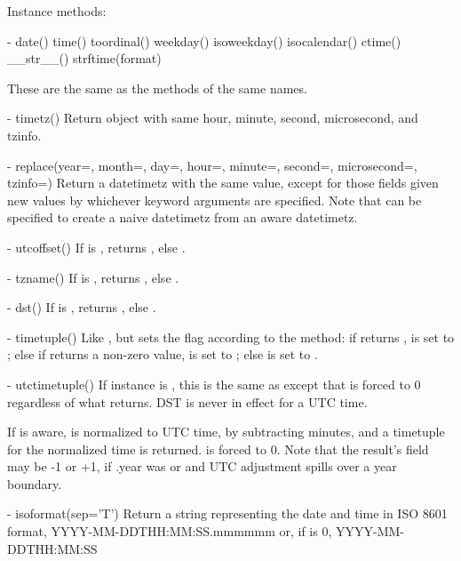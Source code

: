 Instance methods:

  - date()
    time()
    toordinal()
    weekday()
    isoweekday()
    isocalendar()
    ctime()
    __str__()
    strftime(format)

    These are the same as the  methods of the same names.

  - timetz()
    Return  object with same hour, minute, second, microsecond,
    and tzinfo.

  - replace(year=, month=, day=, hour=, minute=, second=, microsecond=,
            tzinfo=)
    Return a datetimetz with the same value, except for those fields given
    new values by whichever keyword arguments are specified.  Note that
     can be specified to create a naive datetimetz from
    an aware datetimetz.

  - utcoffset()
    If  is , returns , else
    .

  - tzname()
    If  is , returns , else
    .

  - dst()
    If  is , returns , else
    .

  - timetuple()
    Like , but sets the
     flag according to the  method:  if
     returns ,  is set to
    ; else if  returns a non-zero value,
     is set to ; else  is set
    to .

  - utctimetuple()
    If  instance  is \naive, this is the same as
     except that  is forced to 0
    regardless of what  returns.  DST is never in effect
    for a UTC time.

    If  is aware,  is normalized to UTC time, by subtracting
     minutes, and a timetuple for the
    normalized time is returned.   is forced to 0.
    Note that the result's  field may be
    -1 or +1, if .year was
     or  and UTC adjustment spills over a
    year boundary.

  - isoformat(sep='T')
    Return a string representing the date and time in ISO 8601 format,
        YYYY-MM-DDTHH:MM:SS.mmmmmm
    or, if  is 0,
        YYYY-MM-DDTHH:MM:SS

